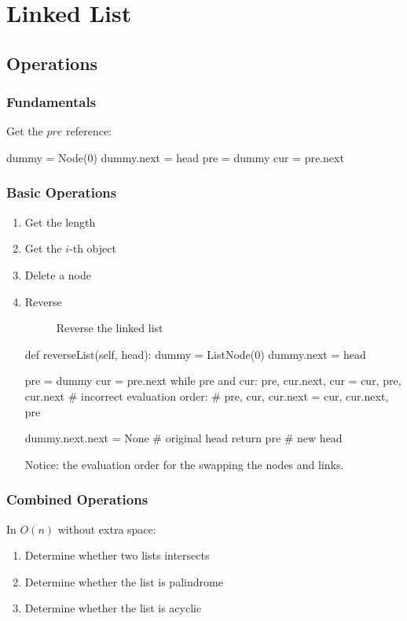 \chapter{Linked List}


\section{Operations}
\subsection{Fundamentals}
Get the $pre$ reference:
\begin{python}
dummy = Node(0)
dummy.next = head
pre = dummy
cur = pre.next
\end{python}

\subsection{Basic Operations}
\begin{enumerate}
\item Get the length
\item Get the $i$-th object
\item Delete a node 
\item Reverse
\begin{figure}[H]
\centering
{}
\caption{Reverse the linked list}
\label{fig:LABEL}
\end{figure}
\begin{python}
def reverseList(self, head):
    dummy = ListNode(0)
    dummy.next = head

    pre = dummy
    cur = pre.next
    while pre and cur:
        pre, cur.next, cur = cur, pre, cur.next
        # incorrect evaluation order:
        # pre, cur, cur.next = cur, cur.next, pre 

    dummy.next.next = None  # original head
    return pre  # new head
\end{python}
Notice: the evaluation order for the swapping the nodes and links. 
\end{enumerate}

\subsection{Combined Operations}
In $O(n)$ without extra space:
\begin{enumerate}
\item Determine whether two lists intersects
\item Determine whether the list is palindrome 
\item Determine whether the list is acyclic
\end{enumerate}
